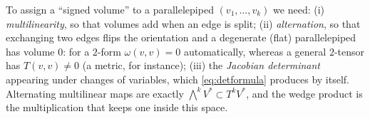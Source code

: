 \begin{keyidea}
To assign a ``signed volume'' to a parallelepiped $(v_1,\dots,v_k)$ we need: (i) \emph{multilinearity}, so that volumes add when an edge is split;
(ii) \emph{alternation}, so that exchanging two edges flips the orientation and a degenerate (flat) parallelepiped has volume $0$: for a $2$-form $\omega(v,v)=0$ automatically, whereas a general $2$-tensor has $T(v,v)\neq0$ (a metric, for instance);
(iii) the \emph{Jacobian determinant} appearing under changes of variables, which \eqref{eq:detformula} produces by itself. Alternating multilinear maps are exactly $\bigwedge^kV^*\subset T^kV^*$, and the wedge product is the multiplication that keeps one inside this space.
\end{keyidea}
